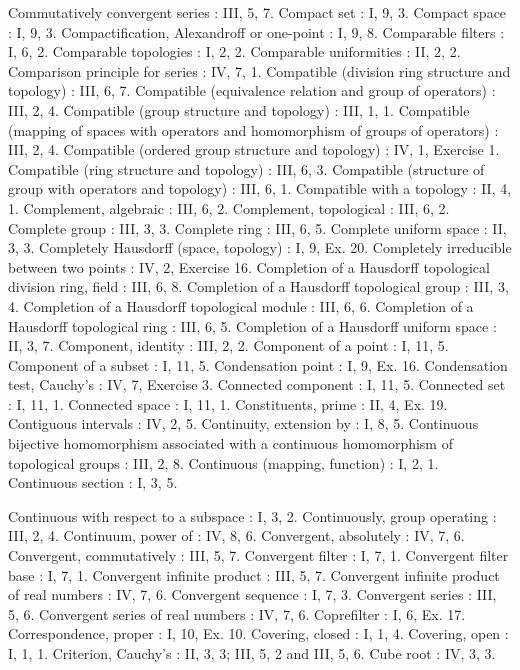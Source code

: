 Commutatively convergent series : III, 5, 7. Compact set : I, 9, 3. Compact space : I, 9, 3. Compactification, Alexandroff or one-point : I, 9, 8. Comparable filters : I, 6, 2. Comparable topologies : I, 2, 2. Comparable uniformities : II, 2, 2. Comparison principle for series : IV, 7, 1. Compatible (division ring structure and topology) : III, 6, 7. Compatible (equivalence relation and group of operators) : III, 2, 4. Compatible (group structure and topology) : III, 1, 1. Compatible (mapping of spaces with operators and homomorphism of groups of operators) : III, 2, 4. Compatible (ordered group structure and topology) : IV, 1, Exercise 1. Compatible (ring structure and topology) : III, 6, 3. Compatible (structure of group with operators and topology) : III, 6, 1. Compatible with a topology : II, 4, 1. Complement, algebraic : III, 6, 2. Complement, topological : III, 6, 2. Complete group : III, 3, 3. Complete ring : III, 6, 5. Complete uniform space : II, 3, 3. Completely Hausdorff (space, topology) : I, 9, Ex. 20. Completely irreducible between two points : IV, 2, Exercise 16. Completion of a Hausdorff topological division ring, field : III, 6, 8. Completion of a Hausdorff topological group : III, 3, 4. Completion of a Hausdorff topological module : III, 6, 6. Completion of a Hausdorff topological ring : III, 6, 5. Completion of a Hausdorff uniform space : II, 3, 7. Component, identity : III, 2, 2. Component of a point : I, 11, 5. Component of a subset : I, 11, 5. Condensation point : I, 9, Ex. 16. Condensation test, Cauchy's : IV, 7, Exercise 3. Connected component : I, 11, 5. Connected set : I, 11, 1. Connected space : I, 11, 1. Constituents, prime : II, 4, Ex. 19. Contiguous intervals : IV, 2, 5. Continuity, extension by : I, 8, 5. Continuous bijective homomorphism associated with a continuous homomorphism of topological groups : III, 2, 8. Continuous (mapping, function) : I, 2, 1. Continuous section : I, 3, 5.

Continuous with respect to a subspace : I, 3, 2. Continuously, group operating : III, 2, 4. Continuum, power of : IV, 8, 6. Convergent, absolutely : IV, 7, 6. Convergent, commutatively : III, 5, 7. Convergent filter : I, 7, 1. Convergent filter base : I, 7, 1. Convergent infinite product : III, 5, 7. Convergent infinite product of real numbers : IV, 7, 6. Convergent sequence : I, 7, 3. Convergent series : III, 5, 6. Convergent series of real numbers : IV, 7, 6. Coprefilter : I, 6, Ex. 17. Correspondence, proper : I, 10, Ex. 10. Covering, closed : I, 1, 4. Covering, open : I, 1, 1. Criterion, Cauchy's : II, 3, 3; III, 5, 2 and III, 5, 6. Cube root : IV, 3, 3.

